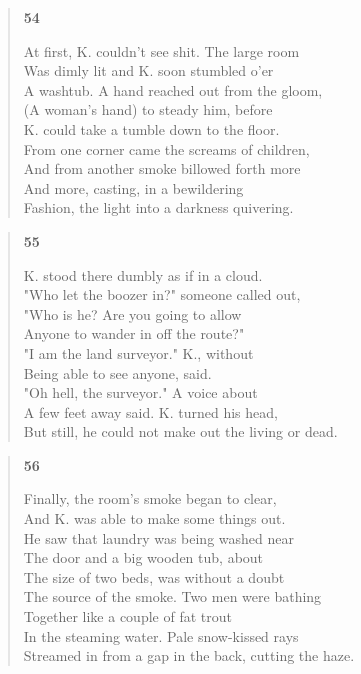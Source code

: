 \documentclass{article}
\begin{document}
\begin{verse}
  \begin{center}
    \textbf{54} \\
  \end{center}
  At first, K. couldn't see shit. The large room \\
  Was dimly lit and K. soon stumbled o'er \\
  A washtub. A hand reached out from the gloom, \\
  (A woman's hand) to steady him, before \\
  K. could take a tumble down to the floor. \\
  From one corner came the screams of children, \\
  And from another smoke billowed forth more \\
  And more, casting, in a bewildering \\
  Fashion, the light into a darkness quivering.
\end{verse}
\begin{verse}
  \begin{center}
    \textbf{55} \\
  \end{center}
  K. stood there dumbly as if in a cloud. \\
  "Who let the boozer in?" someone called out, \\
  "Who is he? Are you going to allow \\
  Anyone to wander in off the route?" \\
  "I am the land surveyor." K., without \\
  Being able to see anyone, said. \\
  "Oh hell, the surveyor." A voice about \\
  A few feet away said. K. turned his head, \\
  But still, he could not make out the living or dead.
\end{verse}
\newpage
\begin{verse}
  \begin{center}
    \textbf{56} \\
  \end{center}
  Finally, the room's smoke began to clear, \\
  And K. was able to make some things out. \\
  He saw that laundry was being washed near \\
  The door and a big wooden tub, about \\
  The size of two beds, was without a doubt \\
  The source of the smoke. Two men were bathing \\
  Together like a couple of fat trout \\
  In the steaming water. Pale snow-kissed rays \\
  Streamed in from a gap in the back, cutting the haze.
\end{verse}
\end{document}
